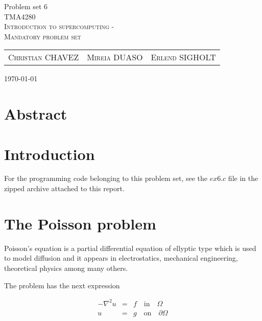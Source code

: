 \documentclass[fontsize=11pt,paper=a4,titlepage]{report}
\begin{document}
\begin{center}


{\huge Problem set 6}\\[0.5cm]

\textsc{\LARGE TMA4280}\\[0.5cm]
\textsc{\large Introduction to supercomputing -}\\
\textsc{\large Mandatory problem set}\\[0.6cm]

\begin{table}[h]
\centering
\begin{tabular}{ccc}
	\textsc{Christian CHAVEZ} & \textsc{Mireia DUASO} & \textsc{Erlend SIGHOLT}
\end{tabular}
\end{table}

\large{\today}
\vfill
\section*{Abstract}
\end{center}


\addtocounter{chapter}{1}

\clearpage
\section{Introduction}

For the programming code belonging to this problem set, see the $\textit{ex6.c}$
file in the zipped archive attached to this report. 


\section{The Poisson problem}

Poisson's equation is a partial differential equation of ellyptic type which is 
used to model diffusion and it appears in electrostatics, mechanical engineering,
theoretical physics among many others.

The problem has the next expression

\begin{eqnarray}
	-\nabla^2 u & = & f \quad \textrm{in} \quad \Omega \\
	u & = & g \quad \textrm{on} \quad \partial\Omega
	\label{eq:Poisson}
\end{eqnarray}
\end{document}
